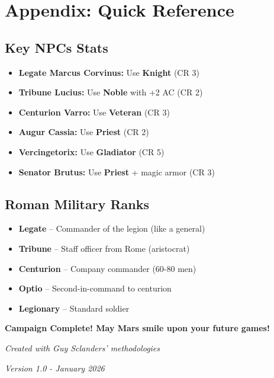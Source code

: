 \documentclass[letterpaper,oneside,twocolumn,openany]{dndbook}
\begin{document}
\chapter{Appendix: Quick Reference}

\section{Key NPCs Stats}

\begin{itemize}
\item \textbf{Legate Marcus Corvinus:} Use \textbf{Knight} (CR 3)
\item \textbf{Tribune Lucius:} Use \textbf{Noble} with +2 AC (CR 2)
\item \textbf{Centurion Varro:} Use \textbf{Veteran} (CR 3)
\item \textbf{Augur Cassia:} Use \textbf{Priest} (CR 2)
\item \textbf{Vercingetorix:} Use \textbf{Gladiator} (CR 5)
\item \textbf{Senator Brutus:} Use \textbf{Priest} + magic armor (CR 3)
\end{itemize}

\section{Roman Military Ranks}

\begin{itemize}
\item \textbf{Legate} – Commander of the legion (like a general)
\item \textbf{Tribune} – Staff officer from Rome (aristocrat)
\item \textbf{Centurion} – Company commander (60-80 men)
\item \textbf{Optio} – Second-in-command to centurion
\item \textbf{Legionary} – Standard soldier
\end{itemize}

\vfill
\begin{center}
\textbf{Campaign Complete! May Mars smile upon your future games!}

\vspace{1em}
\textit{Created with Guy Sclanders' methodologies}

\textit{Version 1.0 - January 2026}
\end{center}
\end{document}
